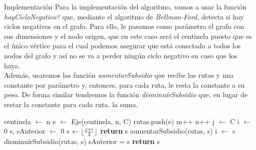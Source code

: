 \begin{subsection}{Implementaci\'{o}n}
Para la implementaci\'{o}n del algoritmo, vamos a usar la funci\'{o}n \textit{hayCicloNegativo?} que, mediante el algoritmo de \textit{Bellman-Ford}, detecta si hay ciclos negativos en el grafo. Para ello, le pasamos como par\'{a}metro el grafo con sus dimensiones y el nodo origen, que  en este caso ser\'{a} el centinela puesto que es el \'{u}nico v\'{e}rtice para el cual podemos asegurar que est\'{a} conectado a todos los nodos del grafo y as\'{i} no se va a perder ning\'{u}n ciclo negativo en caso que los haya. \\
Adem\'{a}s, usaremos las funci\'{o}n \textit{aumentarSubsidio} que recibe las rutas y una constante por par\'{a}metro y, entonces,  para cada ruta, le resta la constante a su peso. De forma similar tendremos la funci\'{o}n \textit{disminu\'{i}rSubsidio} que, en lugar de restar la constante para cada ruta, la suma. 
\begin{algorithm}[H]
  \begin{algorithmic}[1]
    \State centinela $\gets$ n
     
    	\State e $\gets$ Eje(centinela, n, C)
    	\State rutas.push(e)
        \State m++
    \EndFor
    \State n++
	\State j $\leftarrow$ C
    \State i $\leftarrow$ 0
    \State s, sAnterior $\leftarrow$ 0
    \State s $\leftarrow \lfloor\frac{j+i}{2}\rfloor$ 
     \textbf{return} s \EndIIf {}
    \State aumentarSubsidio(rutas, s)
     \Else
     \State i $\leftarrow$ s
     \EndIf
    \State disminu\'{i}rSubsidio(rutas, s)
    \State sAnterior = s
    \EndWhile
    \State \textbf{return} s
    \EndFunction    
  \end{algorithmic}
\end{algorithm}
\end{subsection}


